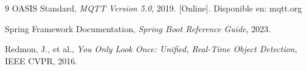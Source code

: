 \documentclass[12pt,a4paper]{article}
\begin{document}
\vspace{1cm}
\begin{thebibliography}{9}
OASIS Standard, \textit{MQTT Version 5.0}, 2019. [Online]. Disponible en: mqtt.org

Spring Framework Documentation, \textit{Spring Boot Reference Guide}, 2023.

Redmon, J., et al., \textit{You Only Look Once: Unified, Real-Time Object Detection}, IEEE CVPR, 2016.
\end{thebibliography}
\end{document}

